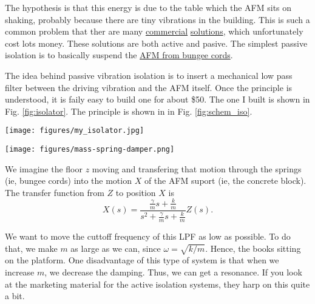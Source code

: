 \documentclass[11pt]{article}
\begin{document}
The hypothesis is that this energy is due to the table which the AFM sits on shaking, probably because there are tiny vibrations in the building. This is such a common problem that ther are many \href{https://www.herzan.com/afm-vibration-control.html}{commercial} \href{https://www.thorlabs.com/newgrouppage9.cfm?objectgroup\_id=1105}{solutions}, which unfortunately cost lots money. These solutions are both active and pasive. The simplest passive isolation is to basically suspend the \href{https://www.afmworkshop.com/afm-products/vibration-solutions/bungee-option}{AFM from bungee cords}. 

The idea behind passive vibration isolation is to insert a mechanical low pass filter between the driving vibration and the AFM itself. 
Once the principle is understood, it is faily easy to build one for about \$50. The one I built is shown in Fig. \ref{fig:isolator}. The principle is shown in in Fig. \ref{fig:schem_iso}. 

\begin{figure*}
\begin{minipage}{0.5\textwidth}
\centering
\texttt{[image: figures/my\_isolator.jpg]}
\caption{\label{fig:isolator}
My home-built vibration isolation chamber}
\end{minipage}

\begin{minipage}{0.5\textwidth}
\centering
\texttt{[image: figures/mass-spring-damper.png]}
\caption{\label{fig:schem_iso}
Mechanical schematic of vibration isolator.}
\end{minipage}
\end{figure*}

We imagine the floor \(z\) moving and transfering that motion through the springs (ie, bungee cords) into the motion \(X\) of the AFM suport (ie, the concrete block). The transfer function from \(Z\) to position \(X\) is
\begin{equation}
    X(s) = \frac{\frac{\gamma}{m}s + \frac{k}{m}}{s^{2} + \frac{\gamma}{m}s + \frac{k}{m}} Z(s).
\end{equation}

We want to move the cuttoff frequency of this LPF as low as possible. To do that, we make \(m\) as large as we can, since \(\omega = \sqrt{k/m}\). Hence, the books sitting on the platform. One disadvantage of this type of system is that when we increase \(m\), we decrease the damping. Thus, we can get a resonance. If you look at the marketing material for the active isolation systems, they harp on this quite a bit. 
\end{document}
